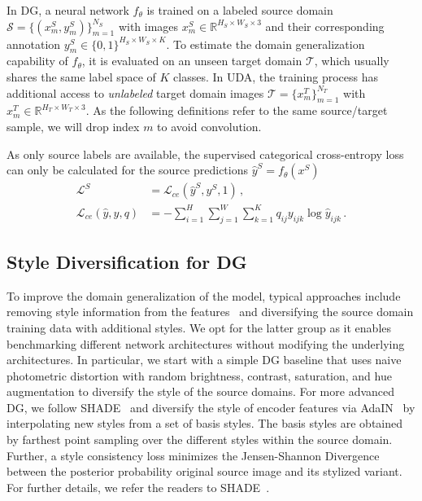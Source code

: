 \documentclass[journal,compsoc]{IEEEtran}
\begin{document}
In DG, a neural network $f_\theta$ is trained on a labeled source domain $\mathcal{S} = \{(x^{S}_m, y^{S}_m)\}_{m=1}^{N_S}$ with images $x^{S}_m \in \mathbb{R}^{H_S \times W_S \times 3}$ and their corresponding annotation $y^{S}_m \in \{0,1\}^{H_S \times W_S \times K}$. To estimate the domain generalization capability of $f_\theta$, it is evaluated on an unseen target domain $\mathcal{T}$, which usually shares the same label space of $K$ classes. In UDA, the training process has additional access to \emph{unlabeled} target domain images $\mathcal{T}= \{x^{T}_m\}_{m=1}^{N_T}$ with $x^{T}_m \in \mathbb{R}^{H_T \times W_T \times 3}$. As the following definitions refer to the same source/target sample, we will drop index $m$ to avoid convolution.

As only source labels are available, the supervised categorical cross-entropy loss can only be calculated for the source predictions $\hat{y}^S = f_\theta(x^S)$
\begin{align}
    \mathcal{L}^S &= \mathcal{L}_\mathit{ce}(\hat{y}^S, y^S, 1)\,,\\
    \mathcal{L}_\mathit{ce}(\hat{y}, y, q) &= -\sum_{i=1}^{H} \sum_{j=1}^{W} \sum_{k=1}^K q_{ij} y_{ijk} \log \hat{y}_{ijk}\,.
\end{align}

\subsection{Style Diversification for DG}
\label{sec:methods_dg}

To improve the domain generalization of the model, typical approaches include removing style information from the features~\cite{pan2018two, choi2021robustnet} and diversifying the source domain training data with additional styles\cite{yue2019domain, peng2021global, zhao2022style}. We opt for the latter group as it enables benchmarking different network architectures without modifying the underlying architectures. In particular, we start with a simple DG baseline that uses naive photometric distortion with random brightness, contrast, saturation, and hue augmentation to diversify the style of the source domains. For more advanced DG, we follow SHADE~\cite{zhao2022style} and diversify the style of encoder features via AdaIN~\cite{huang2017arbitrary} by interpolating new styles from a set of basis styles. The basis styles are obtained by farthest point sampling over the different styles within the source domain. Further, a style consistency loss minimizes the Jensen-Shannon Divergence between the posterior probability original source image and its stylized variant. For further details, we refer the readers to SHADE~\cite{zhao2022style}.
\end{document}
